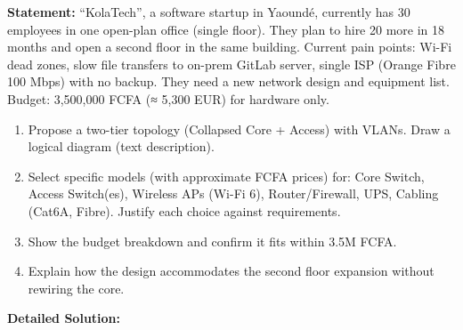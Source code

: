 \documentclass[11pt]{article}
\begin{document}
\begin{exoresolu}
\textbf{Statement:} 
``KolaTech'', a software startup in Yaoundé, currently has 30 employees in one open-plan office (single floor). They plan to hire 20 more in 18 months and open a second floor in the same building. Current pain points: Wi-Fi dead zones, slow file transfers to on-prem GitLab server, single ISP (Orange Fibre 100 Mbps) with no backup. They need a new network design and equipment list. Budget: 3,500,000 FCFA (≈ 5,300 EUR) for hardware only.
\begin{enumerate}
\item Propose a two-tier topology (Collapsed Core + Access) with VLANs. Draw a logical diagram (text description).
\item Select specific models (with approximate FCFA prices) for: Core Switch, Access Switch(es), Wireless APs (Wi-Fi 6), Router/Firewall, UPS, Cabling (Cat6A, Fibre). Justify each choice against requirements.
\item Show the budget breakdown and confirm it fits within 3.5M FCFA.
\item Explain how the design accommodates the second floor expansion without rewiring the core.
\end{enumerate}
\tcblower
\textbf{Detailed Solution:}


\end{exoresolu}
\end{document}
